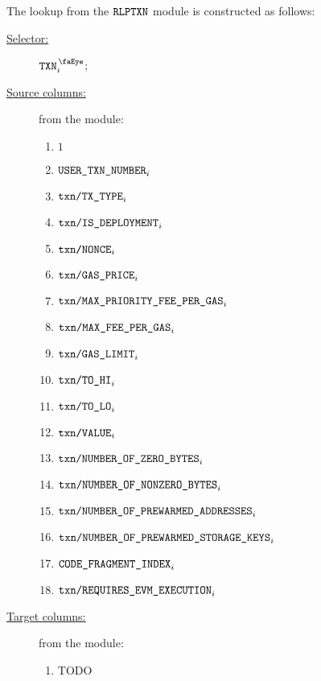 The lookup from the $\texttt{RLPTXN}$ module is constructed as follows:
\begin{description}
	\item[\underline{Selector:}] $\isTxn _{i}$;
	\item[\underline{Source columns:}] from the \rlpTxnMod{} module:
	\begin{multicols}{3}
	\begin{enumerate}
		\item $1$
		\item $\texttt{USER}\texttt{\_}\texttt{TXN\_NUMBER}                       _{i}$
		\item $\texttt{txn}\texttt{/}\texttt{{TX\_TYPE}}               _{i}$
		\item $\texttt{txn}\texttt{/}\texttt{{IS\_DEPLOYMENT}}                _{i}$
		\item $\texttt{txn}\texttt{/}\texttt{{\texttt{NONCE}}}                _{i}$
		\item $\texttt{txn}\texttt{/}\texttt{{GAS\_PRICE}}             _{i}$
		\item $\texttt{txn}\texttt{/}\texttt{{MAX\_PRIORITY\_FEE\_PER\_GAS}} _{i}$
		\item $\texttt{txn}\texttt{/}\texttt{{MAX\_FEE\_PER\_GAS}}         _{i}$
		\item $\texttt{txn}\texttt{/}\texttt{{GAS\_LIMIT}}             _{i}$
		\item $\texttt{txn}\texttt{/}\texttt{{TO\_HI}}                 _{i}$
		\item $\texttt{txn}\texttt{/}\texttt{{TO\_LO}}                 _{i}$
		\item $\texttt{txn}\texttt{/}\texttt{{VALUE}}             _{i}$
		\item $\texttt{txn}\texttt{/}\texttt{{NUMBER\_OF\_ZERO\_BYTES}}         _{i}$
		\item $\texttt{txn}\texttt{/}\texttt{{NUMBER\_OF\_NONZERO\_BYTES}}      _{i}$
		\item $\texttt{txn}\texttt{/}\texttt{{NUMBER\_OF\_PREWARMED\_ADDRESSES}}      _{i}$
		\item $\texttt{txn}\texttt{/}\texttt{{NUMBER\_OF\_PREWARMED\_STORAGE\_KEYS}}   _{i}$
		\item $\texttt{CODE\_FRAGMENT\_INDEX}                                         _{i}$
		\item $\texttt{txn}\texttt{/}\texttt{{REQUIRES\_EVM\_EXECUTION}} _{i}$
	\end{enumerate}
	\end{multicols}
\item[\underline{Target columns:}] from the \userTxnDataMod{} module: 
	\begin{multicols}{3}
	\begin{enumerate}
		\item TODO
	\end{enumerate} 
	\end{multicols}
\end{description}
